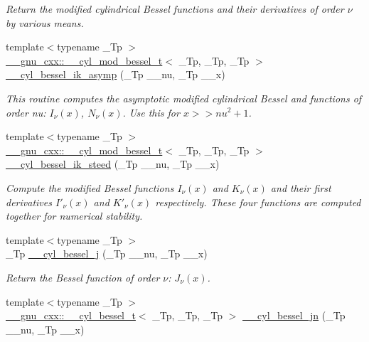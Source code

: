 \begin{DoxyCompactItemize}
\begin{DoxyCompactList}\small\item\em Return the modified cylindrical Bessel functions and their derivatives of order $ \nu $ by various means. \end{DoxyCompactList}\item 
{\footnotesize template$<$typename \+\_\+\+Tp $>$ }\\\hyperlink{struct____gnu__cxx_1_1____cyl__mod__bessel__t}{\+\_\+\+\_\+gnu\+\_\+cxx\+::\+\_\+\+\_\+cyl\+\_\+mod\+\_\+bessel\+\_\+t}$<$ \+\_\+\+Tp, \+\_\+\+Tp, \+\_\+\+Tp $>$ \hyperlink{namespacestd_1_1____detail_a9f88b1d2b4158cc854a91a5ae7b4168d}{\+\_\+\+\_\+cyl\+\_\+bessel\+\_\+ik\+\_\+asymp} (\+\_\+\+Tp \+\_\+\+\_\+nu, \+\_\+\+Tp \+\_\+\+\_\+x)
\begin{DoxyCompactList}\small\item\em This routine computes the asymptotic modified cylindrical Bessel and functions of order nu\+: $ I_{\nu}(x) $, $ N_{\nu}(x) $. Use this for $ x >> nu^2 + 1 $. \end{DoxyCompactList}\item 
{\footnotesize template$<$typename \+\_\+\+Tp $>$ }\\\hyperlink{struct____gnu__cxx_1_1____cyl__mod__bessel__t}{\+\_\+\+\_\+gnu\+\_\+cxx\+::\+\_\+\+\_\+cyl\+\_\+mod\+\_\+bessel\+\_\+t}$<$ \+\_\+\+Tp, \+\_\+\+Tp, \+\_\+\+Tp $>$ \hyperlink{namespacestd_1_1____detail_a0995aa3ea71e25f413e73c07f6b47542}{\+\_\+\+\_\+cyl\+\_\+bessel\+\_\+ik\+\_\+steed} (\+\_\+\+Tp \+\_\+\+\_\+nu, \+\_\+\+Tp \+\_\+\+\_\+x)
\begin{DoxyCompactList}\small\item\em Compute the modified Bessel functions $ I_\nu(x) $ and $ K_\nu(x) $ and their first derivatives $ I'_\nu(x) $ and $ K'_\nu(x) $ respectively. These four functions are computed together for numerical stability. \end{DoxyCompactList}\item 
{\footnotesize template$<$typename \+\_\+\+Tp $>$ }\\\+\_\+\+Tp \hyperlink{namespacestd_1_1____detail_a9909fc0c463a7f0b9259fe02e15fce55}{\+\_\+\+\_\+cyl\+\_\+bessel\+\_\+j} (\+\_\+\+Tp \+\_\+\+\_\+nu, \+\_\+\+Tp \+\_\+\+\_\+x)
\begin{DoxyCompactList}\small\item\em Return the Bessel function of order $ \nu $\+: $ J_{\nu}(x) $. \end{DoxyCompactList}\item 
{\footnotesize template$<$typename \+\_\+\+Tp $>$ }\\\hyperlink{struct____gnu__cxx_1_1____cyl__bessel__t}{\+\_\+\+\_\+gnu\+\_\+cxx\+::\+\_\+\+\_\+cyl\+\_\+bessel\+\_\+t}$<$ \+\_\+\+Tp, \+\_\+\+Tp, \+\_\+\+Tp $>$ \hyperlink{namespacestd_1_1____detail_ae70ea3200a43241a3c6a73d3aa2dc1cc}{\+\_\+\+\_\+cyl\+\_\+bessel\+\_\+jn} (\+\_\+\+Tp \+\_\+\+\_\+nu, \+\_\+\+Tp \+\_\+\+\_\+x)

\end{DoxyCompactItemize}
